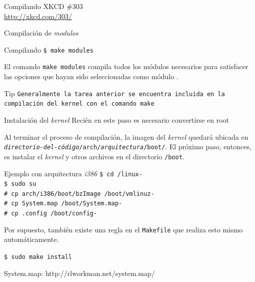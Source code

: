 \begin{frame}{Compilando}
  \large XKCD \#303 \\ \url{http://xkcd.com/303/}
  \begin{center}
   \end{center}
\end{frame}

\begin{frame}{Compilación de \textit{modulos}}
\begin{block}{Compilando}
  \texttt{\$ make modules} 
\end{block}

El comando \texttt{make modules} compila todos los módulos necesarios para satisfacer las opciones que hayan sido seleccionadas como módulo .

\begin{block}{Tip}
\texttt{Generalmente la tarea anterior se encuentra incluida en la compilación del kernel con el comando \texttt{make}}
\end{block}


\end{frame}


\begin{frame}{Instalación del \textit{kernel}}
  \alert{Recién en este paso es necesario convertirse en root}

  Al terminar el proceso de compilación, la imagen del
  \textit{kernel} quedará ubicada en
  \texttt{\textit{directorio-del-código}/arch/\textit{arquitectura}/boot/}. El
  próximo paso, entonces, es instalar el \textit{kernel} y otros archivos
  en el directorio \texttt{/boot}.

  { \tiny
  \begin{block}{Ejemplo con arquitectura \textit{i386}}
    \texttt{\$ cd \KERNELSOURCEPATH/linux-\KERNELBASEVERSION \\
\$ sudo su \\
\# cp arch/i386/boot/bzImage /boot/vmlinuz-\PATCHEDKERNELVERSION \\
\# cp System.map /boot/System.map-\PATCHEDKERNELVERSION \\
\# cp .config /boot/config-\PATCHEDKERNELVERSION}
  \end{block}}
  \vfill \pause

\tiny
  Por supuesto, también existe una regla en el \texttt{Makefile} que
  realiza esto mismo automáticamente.
  { \tiny
  \begin{block}{}
    \texttt{\$ sudo make install}
  \end{block}}
System.map: http://rlworkman.net/system.map/
\end{frame} 

